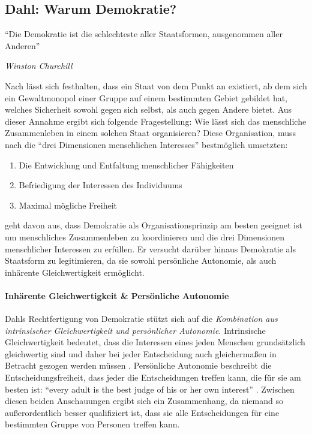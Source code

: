 \subsection{Dahl: Warum Demokratie?}

\epigraph{
		``Die Demokratie ist die schlechteste aller Staatsformen, ausgenommen aller Anderen''
		}
	{
		\emph{Winston Churchill
	}

Nach \citeauthor{Tilly-1985-aa} lässt sich festhalten, dass ein Staat von dem Punkt an existiert, ab dem sich ein Gewaltmonopol einer Gruppe auf einem bestimmten Gebiet gebildet hat, welches Sicherheit sowohl gegen sich selbst, als auch gegen Andere bietet.
Aus dieser Annahme ergibt sich folgende Fragestellung:
Wie lässt sich das menschliche Zusammenleben in einem solchen Staat organisieren?
Diese Organisation, muss nach \citeauthor{Dahl-1989-aa} die ``drei Dimensionen menschlichen Interesses'' bestmöglich umsetzten:

	\begin{enumerate}
		\item Die Entwicklung und Entfaltung menschlicher Fähigkeiten

		\item Befriedigung der Interessen des Individuums

		\item Maximal mögliche Freiheit \parencite[88]{Dahl-1989-aa}
	\end{enumerate}

\citeauthor{Dahl-1989-aa} geht davon aus, dass Demokratie als Organisationsprinzip am besten geeignet ist um menschliches Zusammenleben zu koordinieren und die drei Dimensionen menschlicher Interessen zu erfüllen.
Er versucht darüber hinaus Demokratie als Staatsform zu legitimieren, da sie sowohl persönliche Autonomie, als auch inhärente Gleichwertigkeit ermöglicht.


\paragraph{Inhärente Gleichwertigkeit & Persönliche Autonomie}

Dahls Rechtfertigung von Demokratie stützt sich auf die \emph{Kombination aus intrinsischer Gleichwertigkeit und persönlicher Autonomie}.
Intrinsische Gleichwertigkeit bedeutet, dass die Interessen eines jeden Menschen grundsätzlich gleichwertig sind und daher bei jeder Entscheidung auch gleichermaßen in Betracht gezogen werden müssen \parencite[vgl.][100]{Dahl-1989-aa}.
Persönliche Autonomie beschreibt die Entscheidungsfreiheit, dass jeder die Entscheidungen treffen kann, die für sie am besten ist: ``every adult is the best judge of his or her own interest'' \parencite[100]{Dahl-1989-aa}.
Zwischen diesen beiden Anschauungen ergibt sich ein Zusammenhang, da niemand so außerordentlich besser qualifiziert ist, dass sie alle Entscheidungen für eine bestimmten Gruppe von Personen treffen kann.

}
